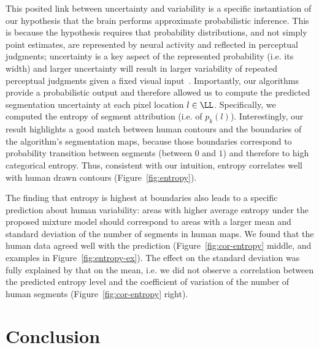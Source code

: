 \documentclass[a4paper,12pt]{article}
\begin{document}
This posited link between uncertainty and variability is a specific instantiation of our hypothesis that the brain performs approximate probabilistic inference. This is because the hypothesis requires that probability distributions, and not simply point estimates, are represented by neural activity and reflected in perceptual judgments; uncertainty is a key aspect of the represented probability (i.e. its width) and larger uncertainty will result in larger variability of repeated perceptual judgments given a fixed visual input~\cite{pouget2013probabilistic,fiser2010statistically}. Importantly, our algorithms provide a probabilistic output and therefore allowed us to compute the predicted segmentation uncertainty at each pixel location $l \in \LL$. Specifically, we computed the entropy of segment attribution (i.e. of $p_{k}(l)$). Interestingly, our result highlights a good match between human contours and the boundaries of the algorithm's segmentation maps, because those boundaries correspond to probability transition between segments (between $0$ and $1$) and therefore to high categorical entropy. Thus, consistent with our intuition, entropy correlates well with human drawn contours (Figure~\ref{fig:entropy}).
%

The finding that entropy is highest at boundaries also leads to a specific prediction about human variability: areas with higher average entropy under the proposed mixture model should correspond to areas with a larger mean and standard deviation of the number of segments in human maps. We found that the human data agreed well with the prediction (Figure~\ref{fig:cor-entropy} middle, and examples in Figure~\ref{fig:entropy-ex}). The effect on the standard deviation was fully explained by that on the mean, i.e. we did not observe a correlation between the predicted entropy level and the coefficient of variation of the number of human segments (Figure~\ref{fig:cor-entropy} right).
 

\section{Conclusion}
\end{document}
